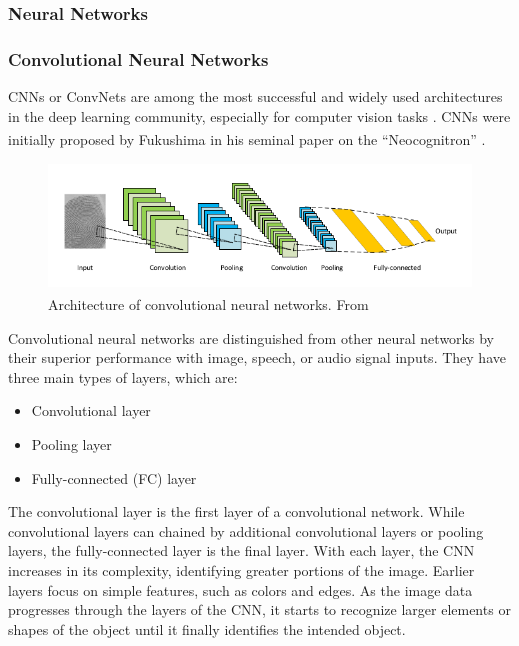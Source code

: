 \subsubsection{Neural Networks}
\subsubsection{Convolutional Neural Networks}
CNNs or ConvNets are among the most successful and widely used architectures in the deep learning community, especially for computer vision tasks . CNNs were initially proposed by Fukushima in his seminal paper on the “Neocognitron” \textsuperscript{\cite{fukushima_Neocognitron}}.

\begin{figure}[H]
\centering
\includegraphics[width=\linewidth]{../images/CNN.png}
\caption{Architecture of convolutional neural networks. From \textsuperscript{\cite{minaee2021image}}}
\label{fig:CNN}
\end{figure}

Convolutional neural networks are distinguished from other neural networks by their superior performance with image, speech, or audio signal inputs. They have three main types of layers, which are:

\begin{itemize}
    \item Convolutional layer
    \item Pooling layer
    \item Fully-connected (FC) layer
\end{itemize}

The convolutional layer is the first layer of a convolutional network. While convolutional layers can chained by additional convolutional layers or pooling layers, the fully-connected layer is the final layer. With each layer, the CNN increases in its complexity, identifying greater portions of the image. Earlier layers focus on simple features, such as colors and edges. As the image data progresses through the layers of the CNN, it starts to recognize larger elements or shapes of the object until it finally identifies the intended object. 
    
